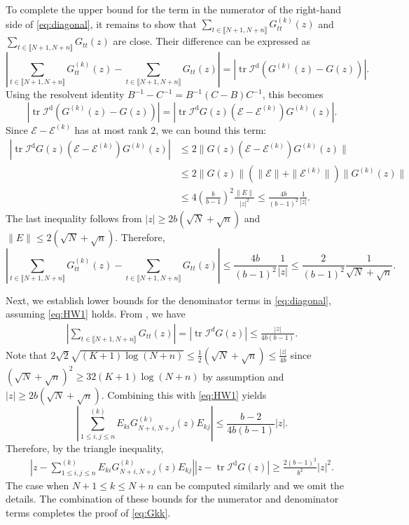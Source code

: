\documentclass[reqno]{amsart}
\DeclareMathOperator{\tr}{tr}
\theoremstyle{plain}
\theoremstyle{definition}
\begin{document}
To complete the upper bound for the term in the numerator of the right-hand side of \eqref{eq:diagonal}, it remains to show that $\sum_{t \in \llbracket N+1,N+n \rrbracket} G_{tt}^{(k)}(z)$ and $\sum_{t \in \llbracket N+1,N+n \rrbracket} G_{tt}(z)$ are close.   Their difference can be expressed as
\[ \left| \sum_{t \in \llbracket N+1,N+n \rrbracket} G_{tt}^{(k)}(z) -\sum_{t \in \llbracket N+1,N+n \rrbracket} G_{tt}(z)\right| = \left|\tr \mathcal I^\mathrm{d}(G^{(k)}(z)-G(z)) \right|. \]
Using the resolvent identity $B^{-1} - C^{-1} = B^{-1} (C - B) C^{-1} $, this becomes
\[ \left|\tr \mathcal I^\mathrm{d}(G^{(k)}(z)-G(z)) \right| = \left| \tr \mathcal I^\mathrm{d} G(z) (\mathcal E - {\mathcal E}^{(k)}) {G}^{(k)}(z)  \right|. \]
Since $\mathcal E - {\mathcal E}^{(k)}$ has at most rank $2$, we can bound this term:
\begin{align*}
 \left| \tr \mathcal I^\mathrm{d} G(z) (\mathcal E - {\mathcal E}^{(k)}) {G}^{(k)}(z)  \right| &\leq 2 \| G(z) (\mathcal E - {\mathcal E}^{(k)}) {G}^{(k)}(z) \| \\
 &\leq 2 \| G(z)\| (\|\mathcal E\| + \|{\mathcal E}^{(k)}\|) \|{G}^{(k)}(z) \| \\
 &\leq 4\left(\frac{b}{b-1}\right)^2\frac{\|E\|}{|z|^2}  \leq  \frac{4b}{(b-1)^2}\frac{1}{|z|}. 
\end{align*}
The last inequality follows from $|z| \ge 2b(\sqrt N+ \sqrt{n})$ and $\|E\| \leq 2(\sqrt N+ \sqrt{n})$.  Therefore,
\[ \left| \sum_{t \in \llbracket N+1,N+n \rrbracket} G_{tt}^{(k)}(z) -\sum_{t \in \llbracket N+1,N+n \rrbracket} G_{tt}(z)\right| \leq \frac{4b}{(b-1)^2}\frac{1}{|z|} \le \frac{2}{(b-1)^2}\frac{1}{\sqrt N + \sqrt n}. \]

Next, we establish lower bounds for the denominator terms in \eqref{eq:diagonal}, assuming \eqref{eq:HW1} holds. From \cite[Eq. (32)]{Wang24}, we have
\begin{align*}
 \left|\sum_{t \in \llbracket N+1,N+n \rrbracket} G_{tt}(z)\right|= |\tr \mathcal I^d G(z)  | \le \frac{|z|}{4b(b-1)}.
\end{align*}
Note that $2\sqrt{2}\sqrt{(K+1)\log (N+n)} \le \frac{1}{2}(\sqrt N + \sqrt n) \le \frac{|z|}{4b}$ since $(\sqrt N + \sqrt n)^2 \ge 32 (K+1)\log(N+n)$ by assumption and $|z|\ge 2b(\sqrt N + \sqrt n)$. Combining this with \eqref{eq:HW1} yields
$$\left|\sum_{1\le i,j\le n}^{(k)} E_{ki} G_{N+i,N+j}^{(k)}(z) E_{kj} \right| \le \frac{b-2}{4b(b-1)}|z|.$$Therefore, by the triangle inequality,
\begin{align*}
 |z - \sum_{1\le i,j\le n}^{(k)} E_{ki} G_{N+i,N+j}^{(k)}(z) E_{kj}| |z - \tr \mathcal I^\mathrm{d} G(z)| \ge \frac{2(b-1)^2}{b^2}|z|^2.
\end{align*}
The case when $N+1\le k \le N+n$ can be computed similarly and we omit the details. The combination of these bounds for the numerator and denominator terms completes the proof of \eqref{eq:Gkk}.
\end{document}
